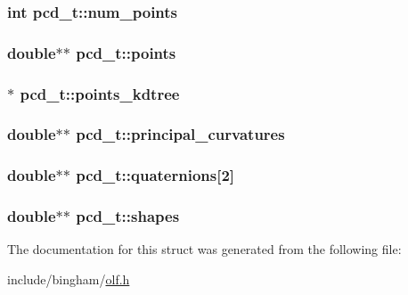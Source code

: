 \label{structpcd__t_a85bedd808d9e6e291242d4d77fb2f969}
\hypertarget{structpcd__t_aec6b9d69c391d335a30664f7a0224b2a}{
\subsubsection[{num\_\-points}]{\setlength{\rightskip}{0pt plus 5cm}int {\bf pcd\_\-t::num\_\-points}}}
\label{structpcd__t_aec6b9d69c391d335a30664f7a0224b2a}
\hypertarget{structpcd__t_ab30ba806b8327b76fa83376f954b6e0a}{
\subsubsection[{points}]{\setlength{\rightskip}{0pt plus 5cm}double$\ast$$\ast$ {\bf pcd\_\-t::points}}}
\label{structpcd__t_ab30ba806b8327b76fa83376f954b6e0a}
\hypertarget{structpcd__t_a0572db064564305853359b6ab93832a9}{
\subsubsection[{points\_\-kdtree}]{$\ast$ {\bf pcd\_\-t::points\_\-kdtree}}}
\label{structpcd__t_a0572db064564305853359b6ab93832a9}
\hypertarget{structpcd__t_a0df6df7fb46f615bb97f4fd7e0e4e353}{
\subsubsection[{principal\_\-curvatures}]{\setlength{\rightskip}{0pt plus 5cm}double$\ast$$\ast$ {\bf pcd\_\-t::principal\_\-curvatures}}}
\label{structpcd__t_a0df6df7fb46f615bb97f4fd7e0e4e353}
\hypertarget{structpcd__t_ae095f52612909ad2dfd4bc7c1dd38cff}{
\subsubsection[{quaternions}]{\setlength{\rightskip}{0pt plus 5cm}double$\ast$$\ast$ {\bf pcd\_\-t::quaternions}\mbox{[}2\mbox{]}}}
\label{structpcd__t_ae095f52612909ad2dfd4bc7c1dd38cff}
\hypertarget{structpcd__t_aa4de24fe6b02d793b103ddb02a949bd1}{
\subsubsection[{shapes}]{\setlength{\rightskip}{0pt plus 5cm}double$\ast$$\ast$ {\bf pcd\_\-t::shapes}}}
\label{structpcd__t_aa4de24fe6b02d793b103ddb02a949bd1}


The documentation for this struct was generated from the following file:\begin{DoxyCompactItemize}
\item 
include/bingham/\hyperlink{olf_8h}{olf.h}\end{DoxyCompactItemize}

